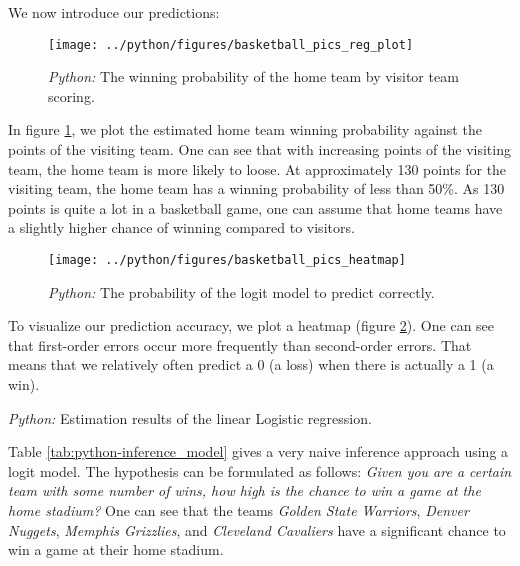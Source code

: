 \documentclass[11pt, a4paper, leqno]{article}
\begin{document}
We now introduce our predictions:


\begin{figure}[H]
\centering
\caption{\emph{Python:} The winning probability of the home team by visitor team scoring.}
\texttt{[image: ../python/figures/basketball\_pics\_reg\_plot]}
    \label{fig:python-reg_plot}

\end{figure}

In figure \ref{fig:python-reg_plot}, we plot the estimated home team winning probability against the points of the visiting team. One can see that with increasing points of the visiting team, the home team is more likely to loose.
At approximately 130 points for the visiting team, the home team has a winning probability of less than 50\%. As 130 points is quite a lot in a basketball game, one can assume that home teams have a slightly higher chance of winning compared to visitors.


\begin{figure}[H]

    \centering
    \caption{\emph{Python:} The probability of the logit model to predict correctly.}
    \texttt{[image: ../python/figures/basketball\_pics\_heatmap]}
    \label{fig:python-heatmap}

\end{figure}

To visualize our prediction accuracy, we plot a heatmap (figure \ref{fig:python-heatmap}). One can see that first-order errors occur more frequently than second-order errors. That means that we relatively often predict a 0 (a loss) when there is actually a 1 (a win).

\begin{table}[H]
    \caption{\label{tab:python-inference_model}\emph{Python:} Estimation results of the
    linear Logistic regression.}
    
\end{table}

Table \ref{tab:python-inference_model} gives a very naive inference approach using a logit model. The hypothesis can be formulated as follows: \textit{Given you are a certain team with some number of wins, how high is the chance to win a game at the home stadium?} One can see that the teams \textit{Golden State Warriors}, \textit{Denver Nuggets}, \textit{Memphis Grizzlies}, and \textit{Cleveland Cavaliers} have a significant chance to win a game at their home stadium.\\
\end{document}
